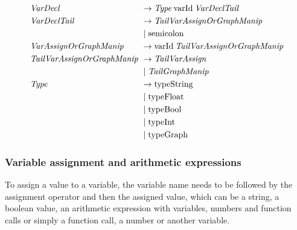 \begin{align*}
    \omit $\mathit{VarDecl}$ \hfil& \rightarrow \mathit{Type} \: \text{varId} \: \mathit{VarDeclTail} \\
    \omit $\mathit{VarDeclTail}$ \hfil & \rightarrow \mathit{TailVarAssignOrGraphManip} \\
    & \mid \text{semicolon} \\
    \omit $\mathit{VarAssignOrGraphManip}$\hfil & \rightarrow \text{varId} \: \mathit{TailVarAssignOrGraphManip} \\
    \omit $\mathit{TailVarAssignOrGraphManip}$ & \rightarrow \mathit{TailVarAssign} \\
    & \mid  \mathit{TailGraphManip}\ \\
    \omit $\mathit{Type}$ \hfil & \rightarrow \text{typeString} \\
    & \mid \text{typeFloat} \\
    & \mid \text{typeBool} \\
    & \mid \text{typeInt}\\
    & \mid \text{typeGraph}
\end{align*}

\subsubsection*{Variable assignment and arithmetic expressions}
To assign a value to a variable, the variable name needs to be followed by the assignment operator and then the assigned value, which can be a string, a boolean value, an arithmetic expression with variables, numbers and function calls or simply a function call, a number or another variable.

